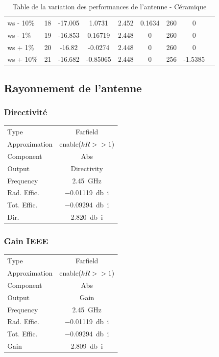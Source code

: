 \documentclass[Deriaz_Traiber_Labo02]{subfiles}
\begin{document}
\begin{table}[H]
\begin{tabular}{|l|c|cc|cc|cc|c|}
    ws - 10\%   & 18  &  -17.005  &       1.0731  &  2.452   &    0.1634  &   260  &       0\\
    ws - 1\%    & 19  &  -16.853  &      0.16719  &  2.448   &         0  &   260  &       0\\
    ws + 1\%    & 20  &   -16.82  &      -0.0274  &  2.448   &         0  &   260  &       0\\
    ws + 10\%   & 21  &  -16.682  &     -0.85065  &  2.448   &         0  &   256  & -1.5385\\\hline
\end{tabular}
\caption{Table de la variation des performances de l'antenne - Céramique}
\label{tab:param-sweep-alumina}
\end{table}

\subsection{Rayonnement de l'antenne}
\subsubsection{Directivité}

\begin{table}[H]
\centering
\begin{tabular}{l c}\hline
Type				& Farfield\\
Approximation	& enable($kR>>1$)\\
Component		& Abs\\
Output			& Directivity\\
Frequency		& \SI{2.45}{\giga\hertz}\\
Rad. Effic.		& \SI{-0.01119}{\decibel i}\\
Tot. Effic.		& \SI{-0.09294}{\decibel i}\\
Dir.				& \SI{2.820}{\decibel i}\\\hline
\end{tabular}
\end{table}

\subsubsection{Gain IEEE}

\begin{table}[H]
\centering
\begin{tabular}{l c}\hline
Type				& Farfield\\
Approximation	& enable($kR>>1$)\\
Component		& Abs\\
Output			& Gain\\
Frequency		& \SI{2.45}{\giga\hertz}\\
Rad. Effic.		& \SI{-0.01119}{\decibel i}\\
Tot. Effic.		& \SI{-0.09294}{\decibel i}\\
Gain				& \SI{2.809}{\decibel i}\\\hline
\end{tabular}
\end{table}
\end{document}

